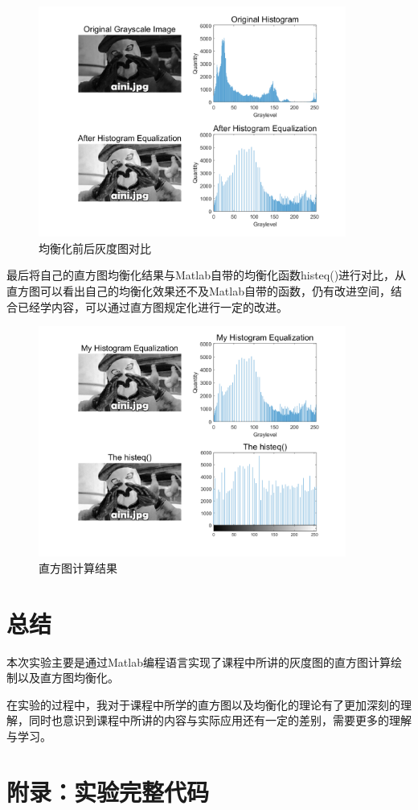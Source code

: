 \documentclass{../source/Experiment}
\begin{document}
\begin{figure}[H]
    \centering
    \includegraphics[width = 0.9\textwidth]{第一次/hw1-3.png}
    \caption{均衡化前后灰度图对比}
\end{figure}

最后将自己的直方图均衡化结果与Matlab自带的均衡化函数histeq()进行对比，从直方图可以看出自己的均衡化效果还不及Matlab自带的函数，仍有改进空间，结合已经学内容，可以通过直方图规定化进行一定的改进。
\begin{figure}[H]
    \centering
    \includegraphics[width = 0.9\textwidth]{第一次/hw1-4.png}
    \caption{直方图计算结果}
\end{figure}

\section{总结}
本次实验主要是通过Matlab编程语言实现了课程中所讲的灰度图的直方图计算绘制以及直方图均衡化。

在实验的过程中，我对于课程中所学的直方图以及均衡化的理论有了更加深刻的理解，同时也意识到课程中所讲的内容与实际应用还有一定的差别，需要更多的理解与学习。

\section{附录：实验完整代码}

\end{document}
